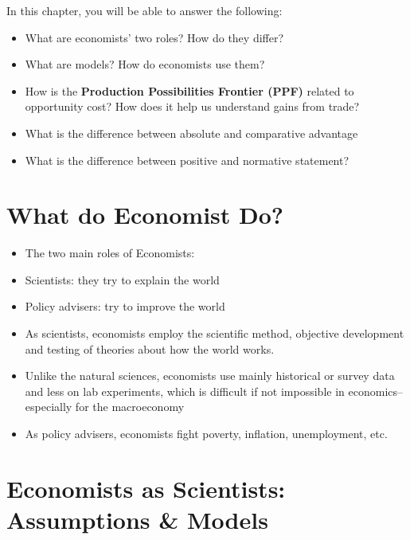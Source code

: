 \documentclass[
]{book}
\begin{document}
In this chapter, you will be able to answer the following:

\begin{itemize}
\item
  What are economists' two roles? How do they differ?
\item
  What are models? How do economists use them?
\item
  How is the \textbf{Production Possibilities Frontier (PPF)} related to opportunity cost? How does it help us understand gains from trade?
\item
  What is the difference between absolute and comparative advantage
\item
  What is the difference between positive and normative statement?
\end{itemize}

\hypertarget{what-do-economist-do}{%
\section{What do Economist Do?}\label{what-do-economist-do}}

\begin{itemize}
\item
  The two main roles of Economists:
\item
  Scientists: they try to explain the world
\item
  Policy advisers: try to improve the world
\item
  As scientists, economists employ the scientific method, objective development and testing of theories about how the world works.
\item
  Unlike the natural sciences, economists use mainly historical or survey data and less on lab experiments, which is difficult if not impossible in economics-- especially for the macroeconomy
\item
  As policy advisers, economists fight poverty, inflation, unemployment, etc.
\end{itemize}

\hypertarget{economists-as-scientists-assumptions-models}{%
\section{Economists as Scientists: Assumptions \& Models}\label{economists-as-scientists-assumptions-models}}
\end{document}
